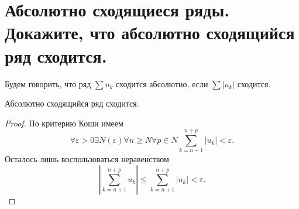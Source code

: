 \section{Абсолютно сходящиеся ряды. Докажите, что абсолютно сходящийся ряд сходится.}

\begin{definition}
    Будем говорить, что ряд $\sum u_k$ сходится абсолютно, если $\sum |u_k|$ сходится.
\end{definition}

\begin{theorem}
    Абсолютно сходящийся ряд сходится.
    \begin{proof}
        По критерию Коши имеем
        \[
            \forall \varepsilon > 0
            \exists N(\varepsilon)
            \forall n \geqslant N
            \forall p \in N
            \sum_{k=n+1}^{n+p} |u_k| < \varepsilon.
        \]
        Осталось лишь воспользоваться неравенством
        \[
            \left|
                \sum_{k=n+1}^{n+p} u_k
            \right|
            \leqslant
            \sum_{k=n+1}^{n+p} |u_k| < \varepsilon.
        \]
    \end{proof}
\end{theorem}